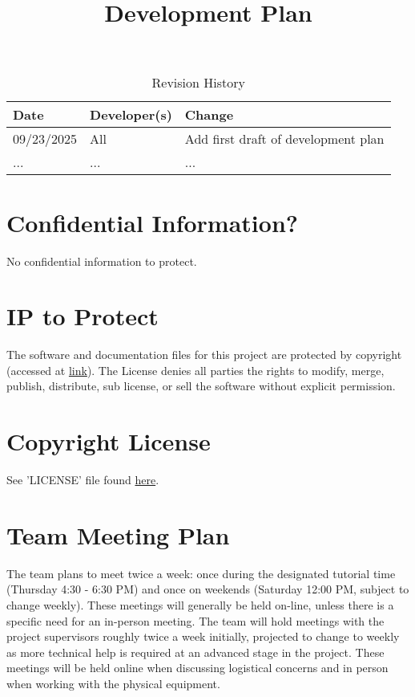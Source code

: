 \documentclass{article}
\title{Development Plan\\\progname}
\author{\authname}
\date{}
\begin{document}
\maketitle

\begin{table}[hp]
\caption{Revision History} \label{TblRevisionHistory}
\begin{tabularx}{\textwidth}{llX}
\toprule
\textbf{Date} & \textbf{Developer(s)} & \textbf{Change}\\
\midrule
09/23/2025 & All & Add first draft of development plan\\
... & ... & ...\\
\bottomrule
\end{tabularx}
\end{table}

\newpage{}

\section{Confidential Information?}

No confidential information to protect.

\section{IP to Protect}

\hspace{\parindent}The software and documentation files for this project are protected by copyright (accessed at \href{https://github.com/mansha71/CapstoneProject/blob/main/LICENSE}{ link}). The License denies all parties the rights to modify, merge, publish, distribute, sub license, or sell the software without explicit permission.

\section{Copyright License}

See 'LICENSE' file found
\href{https://github.com/mansha71/CapstoneProject/blob/main/LICENSE}{here}.

\section{Team Meeting Plan}

\hspace{\parindent} The team plans to meet twice a week: once during the designated tutorial time (Thursday 4:30 - 6:30 PM) and once on weekends (Saturday 12:00 PM, subject to change weekly). These meetings will generally be held on-line, unless there is a specific need for an in-person meeting. The team will hold meetings with the project supervisors roughly twice a week initially, projected to change to weekly as more technical help is required at an advanced stage in the project. These meetings will be held online when discussing logistical concerns and in person when working with the physical equipment.
\end{document}
